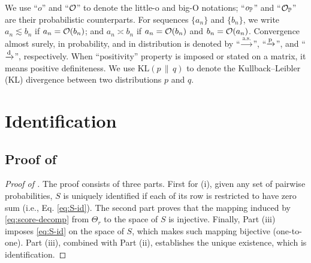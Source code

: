 \documentclass{article}
\begin{document}
\begin{bibunit}[unsrtnat]



We use ``$o$'' and ``$\mathcal{O}$'' to denote the little-o and big-O notations; ``$o_{\mathbb{P}}$'' and ``$\mathcal{O}_{\mathbb{P}}$'' are their probabilistic counterparts. For sequences $\{a_n\}$ and $\{b_n\}$, we write $a_n\lesssim b_n$ if $a_n=\mathcal{O}(b_n)$; and $a_n\asymp b_n$ if $a_n=\mathcal{O}(b_n)$ and $b_n=\mathcal{O}(a_n)$. 
Convergence almost surely, in probability, and in distribution is denoted by ``$\xrightarrow{\mathrm{a.s.}}$'', ``$\xrightarrow{\textup{p}}$'', and ``$\xrightarrow{\textup{d}}$'', respectively. When ``positivity'' property is imposed or stated on a matrix, it means positive definiteness. We use $\mathrm{KL}(p\,\|\,q)$ to denote the Kullback–Leibler (KL) divergence between two distributions $p$ and $q$.



\clearpage
\section{Identification}\label{app:ident}
\subsection[Proof of Proposition 1]{Proof of }\label{app:ident:prop:ident}

\begin{proof}[Proof of ]
    The proof consists of three parts. First for (i), given any set of pairwise probabilities, $S$ is uniquely identified if each of its row is restricted to have zero sum (i.e., Eq. \eqref{eq:S-id}). The second part proves that the mapping induced by \eqref{eq:score-decomp} from $\Theta_r$ to the space of $S$ is injective. Finally, Part (iii) imposes \eqref{eq:S-id} on the space of $S$, which makes such mapping bijective (one-to-one). Part (iii), combined with Part (ii), establishes the unique existence, which is identification.

\end{proof}
\end{bibunit}
\end{document}
